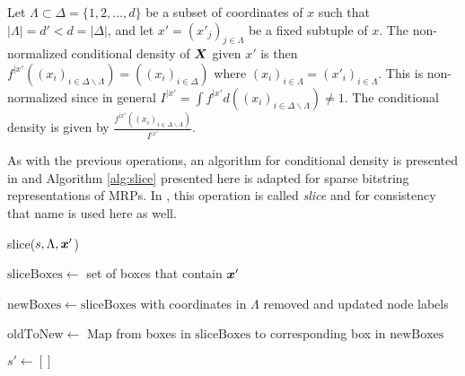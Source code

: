 \documentclass[../histograms.tex]{subfiles}
\begin{document}
  Let $\Lambda \subset \Delta = \{1,2,\dots,d\}$ be a subset of 
  coordinates of $x$ such that $|\Lambda| = d' < d = |\Delta|$,
  and let $x' = (x'_j)_{j \in \Lambda}$ be a fixed subtuple of $x$.
  The non-normalized conditional density of $\X$ given $x'$ is then
  $f^{|x'}\left( (x_i)_{i \in \Delta \backslash \Lambda} \right) =
  \left( (x_i)_{i \in \Delta} \right)$ where $(x_i)_{i \in \Lambda} = (x'_i)_{i \in \Lambda}$.
  This is non-normalized since in general $I^{|x'} = \int f^{|x'} d\left( (x_i)_{i \in \Delta \backslash \Lambda} \right) \neq 1$.
  The conditional density is given by $\frac{f^{|x'}\left( (x_i)_{i \in \Delta \backslash \Lambda} \right)}{I^{|x'}}$.

  As with the previous operations, an algorithm for conditional density is presented in \cite{mrp-raaz-harlow-tucker}
  and Algorithm \ref{alg:slice} presented here is adapted for 
  sparse bitstring representations of MRPs.
  In \cite{mrp-raaz-harlow-tucker}, this operation is called \textit{slice} and 
  for consistency that name is used here as well.

  \begin{algorithm}
    \caption{slice($s, \Lambda, \x'$)}
    \label{alg:slice}

    $\mathrm{sliceBoxes} \gets $ set of boxes that contain $\x'$

    $\mathrm{newBoxes} \gets \mathrm{sliceBoxes}$ with coordinates in $\Lambda$ removed and updated node labels

    $\mathrm{oldToNew} \gets $ Map from boxes in $\mathrm{sliceBoxes}$ to corresponding box in $\mathrm{newBoxes}$

    $s' \gets []$


  \end{algorithm}
\end{document}
